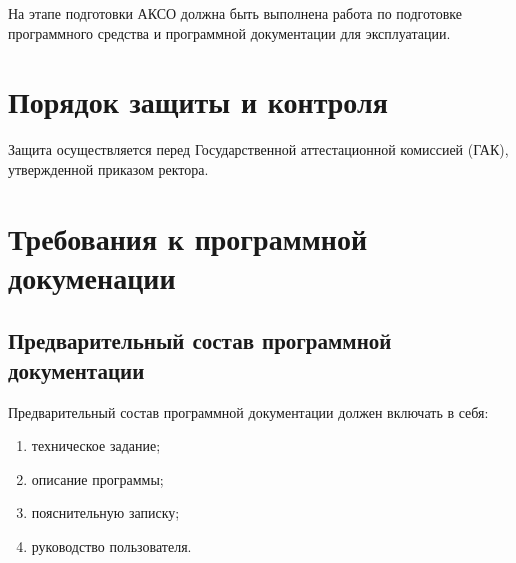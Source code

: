 	На этапе подготовки АКСО должна быть выполнена работа по подготовке программного средства и программной документации для эксплуатации.
	
	\section{Порядок защиты и контроля}
	
	Защита осуществляется перед Государственной аттестационной комиссией (ГАК), утвержденной приказом ректора.
	
	\section{Требования к программной докуменации}
	\subsection{Предварительный состав программной документации}
	\label{subsection:documentation}
	Предварительный состав программной документации должен включать в себя\cite{gostr-9294}:
\begin{enumerate}
	\item техническое задание;
	\item описание программы;
	\item пояснительную записку\cite{methodVKR,methodVKRUrFU};
	\item руководство пользователя.
\end{enumerate}
	
	
	

	
